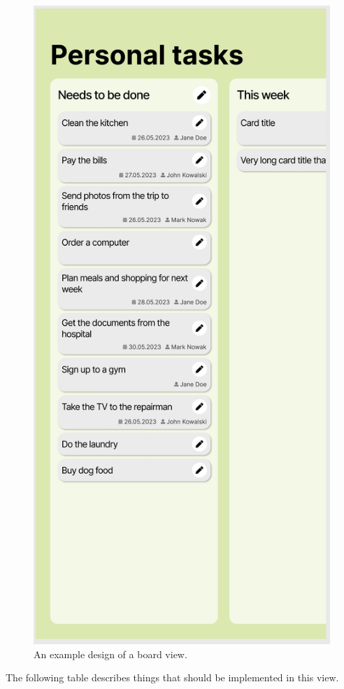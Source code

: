 \begin{figure}
    \centering
    \includegraphics[height=0.5\textheight]{./3-research-methodology/board-view}
    \caption{An example design of a board view.}
    \label{fig:3-4-board-view}
\end{figure}

The following table describes things that should be implemented in this view.
